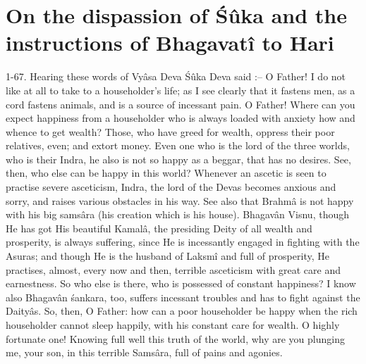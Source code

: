 \chapter{On the dispassion of \'S\^uka and the instructions of Bhagavat\^i to Hari}

1-67. Hearing these words of Vy\^asa Deva \'S\^uka Deva said :-- O Father! I do not like at all to take to a householder's life; as I see clearly that it fastens men, as a cord fastens animals, and is a source of incessant pain. O Father! Where can you expect happiness from a householder who is always loaded with anxiety how and whence to get wealth? Those, who have greed for wealth, oppress their poor relatives, even; and extort money. Even one who is the lord of the three worlds, who is their Indra, he also is not so happy as a beggar, that has no desires. See, then, who else can be happy in this world? Whenever an ascetic is seen to practise severe asceticism, Indra, the lord of the Devas becomes anxious and sorry, and raises various obstacles in his way. See also that Brahm\^a is not happy with his big sams\^ara (his creation which is his house). Bhagav\^an Visnu, though He has got His beautiful Kamal\^a, the presiding Deity of all wealth and prosperity, is always suffering, since He is incessantly engaged in fighting with the Asuras; and though He is the husband of Laksm\^i and full of prosperity, He practises, almost, every now and then, terrible asceticism with great care and earnestness. So who else is there, who is possessed of constant happiness? I know also Bhagav\^an \'sankara, too, suffers incessant troubles and has to fight against the Daity\^as. So, then, O Father: how can a poor householder be happy when the rich householder cannot sleep happily, with his constant care for wealth. O highly fortunate one! Knowing full well this truth of the world, why are you plunging me, your son, in this terrible Sams\^ara, full of pains and agonies.

